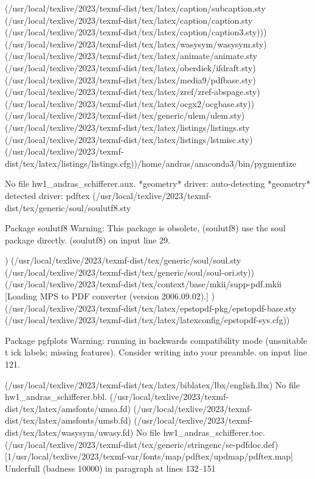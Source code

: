 (/usr/local/texlive/2023/texmf-dist/tex/latex/caption/subcaption.sty
(/usr/local/texlive/2023/texmf-dist/tex/latex/caption/caption.sty
(/usr/local/texlive/2023/texmf-dist/tex/latex/caption/caption3.sty)))
(/usr/local/texlive/2023/texmf-dist/tex/latex/wasysym/wasysym.sty)
(/usr/local/texlive/2023/texmf-dist/tex/latex/animate/animate.sty
(/usr/local/texlive/2023/texmf-dist/tex/latex/oberdiek/ifdraft.sty)
(/usr/local/texlive/2023/texmf-dist/tex/latex/media9/pdfbase.sty)
(/usr/local/texlive/2023/texmf-dist/tex/latex/zref/zref-abspage.sty)
(/usr/local/texlive/2023/texmf-dist/tex/latex/ocgx2/ocgbase.sty))
(/usr/local/texlive/2023/texmf-dist/tex/generic/ulem/ulem.sty)
(/usr/local/texlive/2023/texmf-dist/tex/latex/listings/listings.sty
(/usr/local/texlive/2023/texmf-dist/tex/latex/listings/lstmisc.sty)
(/usr/local/texlive/2023/texmf-dist/tex/latex/listings/listings.cfg))/home/andras/anaconda3/bin/pygmentize

No file hw1_andras_schifferer.aux.
*geometry* driver: auto-detecting
*geometry* detected driver: pdftex
(/usr/local/texlive/2023/texmf-dist/tex/generic/soul/soulutf8.sty

Package soulutf8 Warning: This package is obsolete,
(soulutf8)                use the soul package directly. 
(soulutf8)                 on input line 29.

) (/usr/local/texlive/2023/texmf-dist/tex/generic/soul/soul.sty
(/usr/local/texlive/2023/texmf-dist/tex/generic/soul/soul-ori.sty))
(/usr/local/texlive/2023/texmf-dist/tex/context/base/mkii/supp-pdf.mkii
[Loading MPS to PDF converter (version 2006.09.02).]
) (/usr/local/texlive/2023/texmf-dist/tex/latex/epstopdf-pkg/epstopdf-base.sty
(/usr/local/texlive/2023/texmf-dist/tex/latex/latexconfig/epstopdf-sys.cfg))

Package pgfplots Warning: running in backwards compatibility mode (unsuitable t
ick labels; missing features). Consider writing \pgfplotsset{compat=1.18} into 
your preamble.
 on input line 121.

(/usr/local/texlive/2023/texmf-dist/tex/latex/biblatex/lbx/english.lbx)
No file hw1_andras_schifferer.bbl.
(/usr/local/texlive/2023/texmf-dist/tex/latex/amsfonts/umsa.fd)
(/usr/local/texlive/2023/texmf-dist/tex/latex/amsfonts/umsb.fd)
(/usr/local/texlive/2023/texmf-dist/tex/latex/wasysym/uwasy.fd)
No file hw1_andras_schifferer.toc.
(/usr/local/texlive/2023/texmf-dist/tex/generic/stringenc/se-pdfdoc.def)
[1{/usr/local/texlive/2023/texmf-var/fonts/map/pdftex/updmap/pdftex.map}]
Underfull \hbox (badness 10000) in paragraph at lines 132--151


